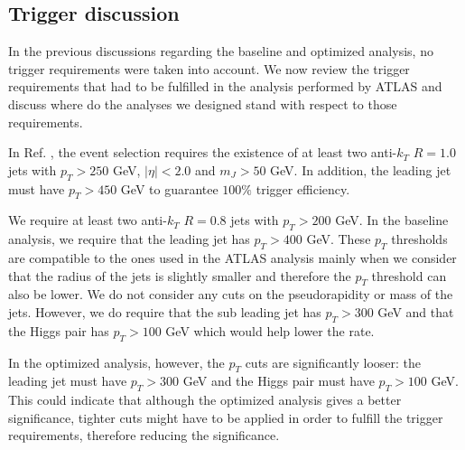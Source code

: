 \subsection{Trigger discussion}

In the previous discussions regarding the baseline and optimized analysis, no trigger requirements were taken into account. We now review the trigger requirements that had to be fulfilled in the analysis performed by ATLAS and discuss where do the analyses we designed stand with respect to those requirements. 

In Ref. \cite{hh2bbbbATLAS1}, the event selection requires the existence of at least two anti-$k_T$ $R=1.0$ jets with $p_T>250$ GeV, $|\eta|<2.0$ and $m_J>50$ GeV. In addition, the leading jet must have $p_T>450$ GeV to guarantee $100\%$ trigger efficiency. 

We require at least two anti-$k_T$ $R=0.8$ jets with $p_T>200$ GeV. In the baseline analysis, we require that the leading jet has $p_T>400$ GeV. These $p_T$ thresholds are compatible to the ones used in the ATLAS analysis mainly when we consider that the radius of the jets is slightly smaller and therefore the $p_T$ threshold can also be lower. We do not consider any cuts on the pseudorapidity or mass of the jets. However, we do require that the sub leading jet has $p_T>300$ GeV and that the Higgs pair has $p_T>100$ GeV which would help lower the rate. 

In the optimized analysis, however, the $p_T$ cuts are significantly looser: the leading jet must have $p_T>300$ GeV and the Higgs pair must have $p_T>100$ GeV. This could indicate that although the optimized analysis gives a better significance, tighter cuts might have to be applied in order to fulfill the trigger requirements, therefore reducing the significance.

